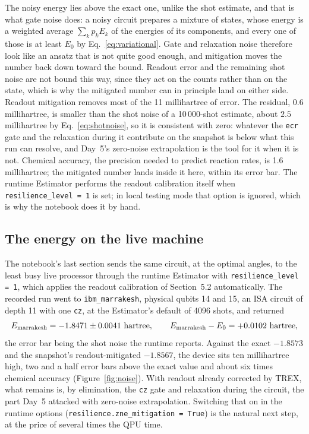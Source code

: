 \documentclass[11pt]{article}
\newcommand{\code}[1]{\texttt{#1}}
\begin{document}
The noisy energy lies above the exact one, unlike the shot estimate, and that is what gate noise does: a noisy circuit prepares a mixture of states, whose energy is a weighted average $\sum_k p_k E_k$ of the energies of its components, and every one of those is at least $E_0$ by Eq.~\eqref{eq:variational}. Gate and relaxation noise therefore look like an ansatz that is not quite good enough, and mitigation moves the number back down toward the bound. Readout error and the remaining shot noise are not bound this way, since they act on the counts rather than on the state, which is why the mitigated number can in principle land on either side. Readout mitigation removes most of the 11 millihartree of error. The residual, $0.6$ millihartree, is smaller than the shot noise of a 10\,000-shot estimate, about $2.5$ millihartree by Eq.~\eqref{eq:shotnoise}, so it is consistent with zero: whatever the \code{ecr} gate and the relaxation during it contribute on the snapshot is below what this run can resolve, and Day~5's zero-noise extrapolation is the tool for it when it is not. Chemical accuracy, the precision needed to predict reaction rates, is 1.6 millihartree; the mitigated number lands inside it here, within its error bar. The runtime Estimator performs the readout calibration itself when \code{resilience\_level = 1} is set; in local testing mode that option is ignored, which is why the notebook does it by hand.

\subsection{The energy on the live machine}
\label{sec:live}

The notebook's last section sends the same circuit, at the optimal angles, to the least busy live processor through the runtime Estimator with \code{resilience\_level = 1}, which applies the readout calibration of Section~5.2 automatically. The recorded run went to \code{ibm\_marrakesh}, physical qubits 14 and 15, an ISA circuit of depth 11 with one \code{cz}, at the Estimator's default of 4096 shots, and returned
\begin{equation}
E_{\rm marrakesh} = -1.8471 \pm 0.0041\ \text{hartree},\qquad E_{\rm marrakesh} - E_0 = +0.0102\ \text{hartree},
\label{eq:live}
\end{equation}
the error bar being the shot noise the runtime reports. Against the exact $-1.8573$ and the snapshot's readout-mitigated $-1.8567$, the device sits ten millihartree high, two and a half error bars above the exact value and about six times chemical accuracy (Figure~\ref{fig:noise}). With readout already corrected by TREX, what remains is, by elimination, the \code{cz} gate and relaxation during the circuit, the part Day~5 attacked with zero-noise extrapolation. Switching that on in the runtime options (\code{resilience.zne\_mitigation = True}) is the natural next step, at the price of several times the QPU time.
\end{document}
